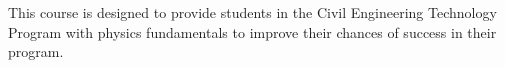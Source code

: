 {This course is designed to provide students in the Civil Engineering Technology Program with physics fundamentals to improve their chances of success in their program.}
